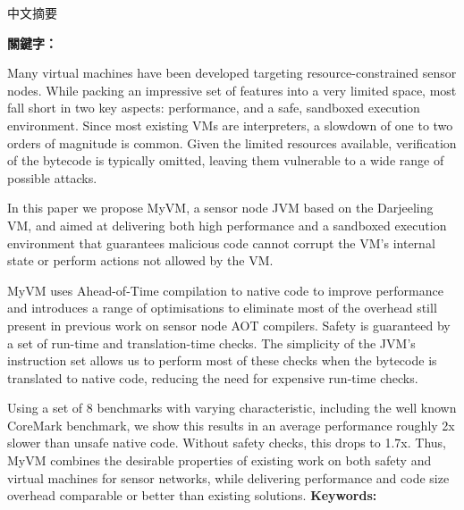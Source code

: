 \begin{abstractzh}
中文摘要

\bigbreak
\noindent \textbf{關鍵字：}{\, \makeatletter \@keywordszh \makeatother}
\end{abstractzh}

\begin{abstracten}
Many virtual machines have been developed targeting resource-constrained sensor nodes. While packing an impressive set of features into a very limited space, most fall short in two key aspects: performance, and a safe, sandboxed execution environment. Since most existing VMs are interpreters, a slowdown of one to two orders of magnitude is common. Given the limited resources available, verification of the bytecode is typically omitted, leaving them vulnerable to a wide range of possible attacks.

In this paper we propose MyVM, a sensor node JVM based on the Darjeeling VM, and aimed at delivering both high performance and a sandboxed execution environment that guarantees malicious code cannot corrupt the VM's internal state or perform actions not allowed by the VM.

MyVM uses Ahead-of-Time compilation to native code to improve performance and introduces a range of optimisations to eliminate most of the overhead still present in previous work on sensor node AOT compilers. Safety is guaranteed by a set of run-time and translation-time checks. The simplicity of the JVM's instruction set allows us to perform most of these checks when the bytecode is translated to native code, reducing the need for expensive run-time checks.

Using a set of 8 benchmarks with varying characteristic, including the well known CoreMark benchmark, we show this results in an average performance roughly 2x slower than unsafe native code. Without safety checks, this drops to 1.7x. Thus, MyVM combines the desirable properties of existing work on both safety and virtual machines for sensor networks, while delivering performance and code size overhead comparable or better than existing solutions.
\bigbreak
\noindent \textbf{Keywords:}{\, \makeatletter \@keywordsen \makeatother}
\end{abstracten}

\begin{comment}


\end{comment}
